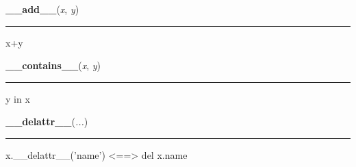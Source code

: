     \label{list:__add__}

    \vspace{0.5ex}

    \begin{boxedminipage}{\textwidth}

    \raggedright \textbf{\_\_add\_\_}(\textit{x}, \textit{y})

    \vspace{-1.5ex}

    \rule{\textwidth}{0.5\fboxrule}

x+y
    \vspace{1ex}

    \end{boxedminipage}

    \label{list:__contains__}

    \vspace{0.5ex}

    \begin{boxedminipage}{\textwidth}

    \raggedright \textbf{\_\_contains\_\_}(\textit{x}, \textit{y})

    \vspace{-1.5ex}

    \rule{\textwidth}{0.5\fboxrule}

y in x
    \vspace{1ex}

    \end{boxedminipage}

    \label{object:__delattr__}

    \vspace{0.5ex}

    \begin{boxedminipage}{\textwidth}

    \raggedright \textbf{\_\_delattr\_\_}(\textit{...})

    \vspace{-1.5ex}

    \rule{\textwidth}{0.5\fboxrule}

x.{\_}{\_}delattr{\_}{\_}('name') {\textless}=={\textgreater} del x.name
    \vspace{1ex}

    \end{boxedminipage}

    \label{list:__delitem__}

